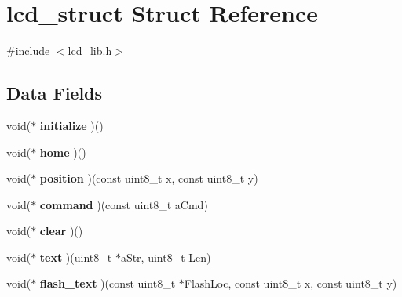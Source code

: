 \hypertarget{structlcd__struct}{\section{lcd\-\_\-struct Struct Reference}
\label{structlcd__struct}
}


{\ttfamily \#include $<$lcd\-\_\-lib.\-h$>$}

\subsection*{Data Fields}
\begin{DoxyCompactItemize}
\item 
\hypertarget{structlcd__struct_a80085ad1a042df718d84889bdc53a5d1}{void($\ast$ {\bfseries initialize} )()}\label{structlcd__struct_a80085ad1a042df718d84889bdc53a5d1}

\item 
\hypertarget{structlcd__struct_abd928eaa7b5ec81ba90d5fc86d129dae}{void($\ast$ {\bfseries home} )()}\label{structlcd__struct_abd928eaa7b5ec81ba90d5fc86d129dae}

\item 
\hypertarget{structlcd__struct_a2c7e90d97464a6ba047e8eadead9b5a7}{void($\ast$ {\bfseries position} )(const uint8\-\_\-t x, const uint8\-\_\-t y)}\label{structlcd__struct_a2c7e90d97464a6ba047e8eadead9b5a7}

\item 
\hypertarget{structlcd__struct_ad035aa8a08d9d1eeff385e75944191bd}{void($\ast$ {\bfseries command} )(const uint8\-\_\-t a\-Cmd)}\label{structlcd__struct_ad035aa8a08d9d1eeff385e75944191bd}

\item 
\hypertarget{structlcd__struct_aabed28ded4ca42bc66db4676d8a9080c}{void($\ast$ {\bfseries clear} )()}\label{structlcd__struct_aabed28ded4ca42bc66db4676d8a9080c}

\item 
\hypertarget{structlcd__struct_a9375f71c7398d972ba2746c5b58b3b75}{void($\ast$ {\bfseries text} )(uint8\-\_\-t $\ast$a\-Str, uint8\-\_\-t Len)}\label{structlcd__struct_a9375f71c7398d972ba2746c5b58b3b75}

\item 
\hypertarget{structlcd__struct_a954221c060b05fe1865a16ca7ed0a9d4}{void($\ast$ {\bfseries flash\-\_\-text} )(const uint8\-\_\-t $\ast$Flash\-Loc, const uint8\-\_\-t x, const uint8\-\_\-t y)}\label{structlcd__struct_a954221c060b05fe1865a16ca7ed0a9d4}


\end{DoxyCompactItemize}
